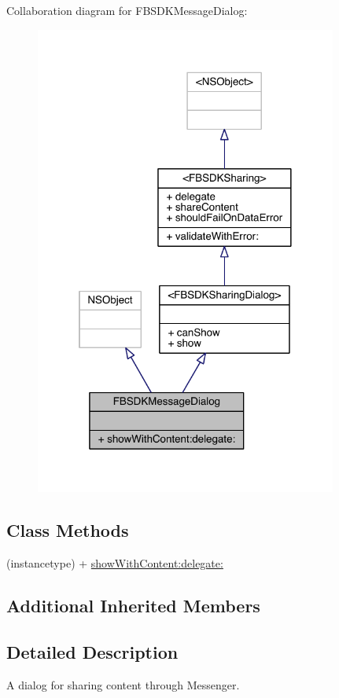 Collaboration diagram for F\-B\-S\-D\-K\-Message\-Dialog\-:
\nopagebreak
\begin{figure}[H]
\begin{center}
\leavevmode
\includegraphics[width=281pt]{interface_f_b_s_d_k_message_dialog__coll__graph}
\end{center}
\end{figure}
\subsection*{Class Methods}
\begin{DoxyCompactItemize}
\item 
(instancetype) + \hyperlink{interface_f_b_s_d_k_message_dialog_aef7d0cbccecedeb9102ad6b08f9a5407}{show\-With\-Content\-:delegate\-:}
\end{DoxyCompactItemize}
\subsection*{Additional Inherited Members}


\subsection{Detailed Description}
A dialog for sharing content through Messenger. 

